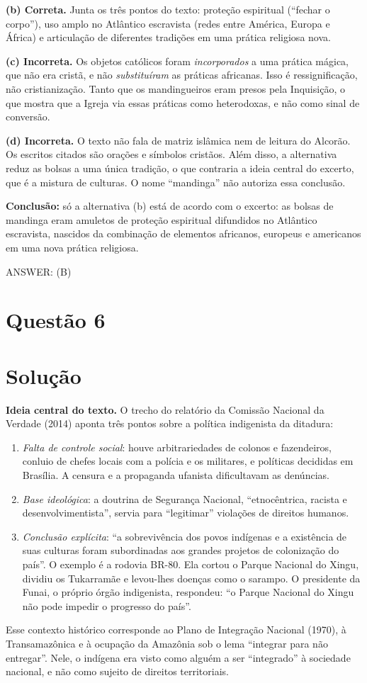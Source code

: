\documentclass{article}%
\begin{document}
\textbf{(b) Correta.} Junta os três pontos do texto: proteção espiritual (``fechar o corpo''), uso amplo no Atlântico escravista (redes entre América, Europa e África) e articulação de diferentes tradições em uma prática religiosa nova.

\textbf{(c) Incorreta.} Os objetos católicos foram \emph{incorporados} a uma prática mágica, que não era cristã, e não \emph{substituíram} as práticas africanas. Isso é ressignificação, não cristianização. Tanto que os mandingueiros eram presos pela Inquisição, o que mostra que a Igreja via essas práticas como heterodoxas, e não como sinal de conversão.

\textbf{(d) Incorreta.} O texto não fala de matriz islâmica nem de leitura do Alcorão. Os escritos citados são orações e símbolos cristãos. Além disso, a alternativa reduz as bolsas a uma única tradição, o que contraria a ideia central do excerto, que é a mistura de culturas. O nome ``mandinga'' não autoriza essa conclusão.

\textbf{Conclusão:} só a alternativa (b) está de acordo com o excerto: as bolsas de mandinga eram amuletos de proteção espiritual difundidos no Atlântico escravista, nascidos da combinação de elementos africanos, europeus e americanos em uma nova prática religiosa.

ANSWER: (B)%
\newpage%
\section*{Questão 6}

\section*{Solução}

\textbf{Ideia central do texto.} O trecho do relatório da Comissão Nacional da Verdade (2014) aponta três pontos sobre a política indigenista da ditadura:
\begin{enumerate}
\item \emph{Falta de controle social}: houve arbitrariedades de colonos e fazendeiros, conluio de chefes locais com a polícia e os militares, e políticas decididas em Brasília. A censura e a propaganda ufanista dificultavam as denúncias.
\item \emph{Base ideológica}: a doutrina de Segurança Nacional, ``etnocêntrica, racista e desenvolvimentista'', servia para ``legitimar'' violações de direitos humanos.
\item \emph{Conclusão explícita}: ``a sobrevivência dos povos indígenas e a existência de suas culturas foram subordinadas aos grandes projetos de colonização do país''. O exemplo é a rodovia BR-80. Ela cortou o Parque Nacional do Xingu, dividiu os Tukarramãe e levou-lhes doenças como o sarampo. O presidente da Funai, o próprio órgão indigenista, respondeu: ``o Parque Nacional do Xingu não pode impedir o progresso do país''.
\end{enumerate}
Esse contexto histórico corresponde ao Plano de Integração Nacional (1970), à Transamazônica e à ocupação da Amazônia sob o lema ``integrar para não entregar''. Nele, o indígena era visto como alguém a ser ``integrado'' à sociedade nacional, e não como sujeito de direitos territoriais.
\end{document}
